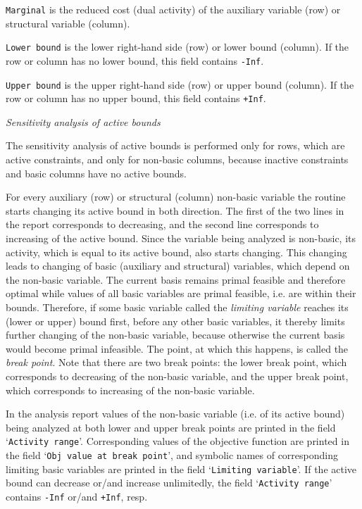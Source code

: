 \noindent
{\tt Marginal} is the reduced cost (dual activity) of the auxiliary
variable (row) or structural variable (column).

\medskip

\noindent
{\tt Lower bound} is the lower right-hand side (row) or lower bound
(column). If the row or column has no lower bound, this field contains
{\tt -Inf}.

\medskip

\noindent
{\tt Upper bound} is the upper right-hand side (row) or upper bound
(column). If the row or column has no upper bound, this field contains
{\tt +Inf}.

\bigskip

\noindent
{\it Sensitivity analysis of active bounds}

\medskip

\noindent
The sensitivity analysis of active bounds is performed only for rows,
which are active constraints, and only for non-basic columns, because
inactive constraints and basic columns have no active bounds.

For every auxiliary (row) or structural (column) non-basic variable the
routine starts changing its active bound in both direction. The first
of the two lines in the report corresponds to decreasing, and the
second line corresponds to increasing of the active bound. Since the
variable being analyzed is non-basic, its activity, which is equal to
its active bound, also starts changing. This changing leads to changing
of basic (auxiliary and structural) variables, which depend on the
non-basic variable. The current basis remains primal feasible and
therefore optimal while values of all basic variables are primal
feasible, i.e. are within their bounds. Therefore, if some basic
variable called the {\it limiting variable} reaches its (lower or
upper) bound first, before any other basic variables, it thereby limits
further changing of the non-basic variable, because otherwise the
current basis would become primal infeasible. The point, at which this
happens, is called the {\it break point}. Note that there are two break
points: the lower break point, which corresponds to decreasing of the
non-basic variable, and the upper break point, which corresponds to
increasing of the non-basic variable.

In the analysis report values of the non-basic variable (i.e. of its
active bound) being analyzed at both lower and upper break points are
printed in the field `{\tt Activity range}'. Corresponding values of
the objective function are printed in the field `{\tt Obj value at
break point}', and symbolic names of corresponding limiting basic
variables are printed in the field `{\tt Limiting variable}'.
If the active bound can decrease or/and increase unlimitedly, the field
`{\tt Activity range}' contains {\tt -Inf} or/and {\tt +Inf}, resp.

